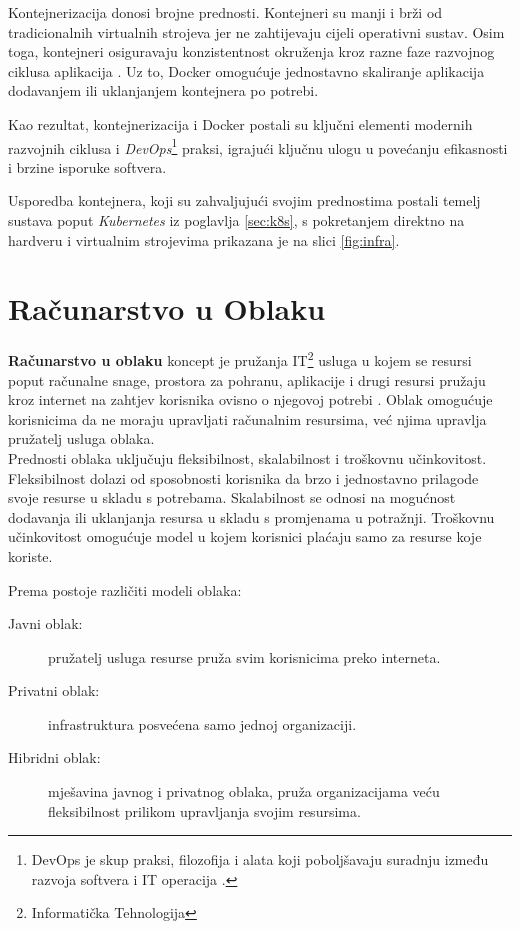 \documentclass[times, utf8, diplomski]{fer}
\begin{document}
Kontejnerizacija donosi brojne prednosti. Kontejneri su manji i brži od tradicionalnih virtualnih strojeva jer ne zahtijevaju cijeli operativni sustav. Osim toga, kontejneri osiguravaju konzistentnost okruženja kroz razne faze razvojnog ciklusa aplikacija \citep{gillis_what_2020}. Uz to, Docker omogućuje jednostavno skaliranje aplikacija dodavanjem ili uklanjanjem kontejnera po potrebi.

Kao rezultat, kontejnerizacija i Docker postali su ključni elementi modernih razvojnih ciklusa i \emph{DevOps}\footnote{DevOps je skup praksi, filozofija i alata koji poboljšavaju suradnju između razvoja softvera  i IT operacija  \citep{courtemanche_what_2021}.} praksi, igrajući ključnu ulogu u povećanju efikasnosti i brzine isporuke softvera. 

Usporedba kontejnera, koji su zahvaljujući svojim prednostima postali temelj sustava poput \emph{Kubernetes} iz poglavlja \ref{sec:k8s}, s pokretanjem direktno na hardveru i virtualnim strojevima prikazana je na slici \ref{fig:infra}.

\section{Računarstvo u Oblaku}

\textbf{Računarstvo u oblaku}  koncept je pružanja IT\footnote{Informatička Tehnologija } usluga u kojem se resursi poput računalne snage, prostora za pohranu, aplikacije i drugi resursi pružaju kroz internet na zahtjev korisnika ovisno o njegovoj potrebi \citep{zarko_raspodijeljeni_2013}. Oblak omogućuje korisnicima da ne moraju upravljati računalnim resursima, već njima upravlja pružatelj usluga oblaka. \\

Prednosti oblaka uključuju fleksibilnost, skalabilnost i troškovnu učinkovitost. Fleksibilnost dolazi od sposobnosti korisnika da brzo i jednostavno prilagode svoje resurse u skladu s potrebama. Skalabilnost se odnosi na mogućnost dodavanja ili uklanjanja resursa u skladu s promjenama u potražnji. Troškovnu učinkovitost omogućuje model u kojem korisnici plaćaju samo za resurse koje koriste.

Prema \citet{zarko_raspodijeljeni_2013} postoje različiti modeli oblaka:
\begin{description}
	\item [Javni oblak:] pružatelj usluga resurse pruža svim korisnicima preko interneta.
	\item [Privatni oblak:] infrastruktura posvećena samo jednoj organizaciji.
	\item [Hibridni oblak:] mješavina javnog i privatnog oblaka, pruža organizacijama veću fleksibilnost prilikom upravljanja svojim resursima.
\end{description}
\end{document}

